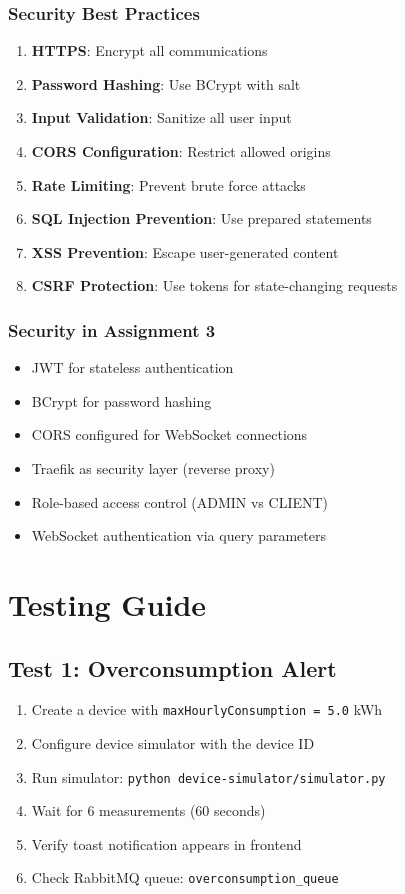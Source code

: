 \documentclass[12pt,a4paper]{article}
\begin{document}
\subsubsection{Security Best Practices}
\begin{enumerate}
    \item \textbf{HTTPS}: Encrypt all communications
    \item \textbf{Password Hashing}: Use BCrypt with salt
    \item \textbf{Input Validation}: Sanitize all user input
    \item \textbf{CORS Configuration}: Restrict allowed origins
    \item \textbf{Rate Limiting}: Prevent brute force attacks
    \item \textbf{SQL Injection Prevention}: Use prepared statements
    \item \textbf{XSS Prevention}: Escape user-generated content
    \item \textbf{CSRF Protection}: Use tokens for state-changing requests
\end{enumerate}

\subsubsection{Security in Assignment 3}
\begin{itemize}
    \item JWT for stateless authentication
    \item BCrypt for password hashing
    \item CORS configured for WebSocket connections
    \item Traefik as security layer (reverse proxy)
    \item Role-based access control (ADMIN vs CLIENT)
    \item WebSocket authentication via query parameters
\end{itemize}

\section{Testing Guide}

\subsection{Test 1: Overconsumption Alert}
\begin{enumerate}
    \item Create a device with \texttt{maxHourlyConsumption = 5.0} kWh
    \item Configure device simulator with the device ID
    \item Run simulator: \texttt{python device-simulator/simulator.py}
    \item Wait for 6 measurements (60 seconds)
    \item Verify toast notification appears in frontend
    \item Check RabbitMQ queue: \texttt{overconsumption\_queue}
\end{enumerate}
\end{document}
